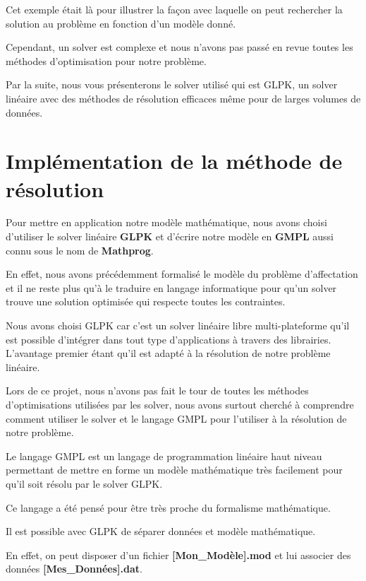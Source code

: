 \documentclass[final,poster]{polytech/polytech}
\begin{document}
Cet exemple était là pour illustrer la façon avec laquelle on peut rechercher la solution au problème en fonction d'un modèle donné.

Cependant, un solver est complexe et nous n'avons pas passé en revue toutes les méthodes d'optimisation pour notre problème.

Par la suite, nous vous présenterons le solver utilisé qui est GLPK, un solver linéaire avec des méthodes de résolution efficaces même pour de larges volumes de données.

\section{Implémentation de la méthode de résolution}

Pour mettre en application notre modèle mathématique, nous avons choisi d'utiliser le solver linéaire \textbf{GLPK} et d'écrire notre modèle en \textbf{GMPL} aussi connu sous le nom de \textbf{Mathprog}.

En effet, nous avons précédemment formalisé le modèle du problème d'affectation et il ne reste plus qu'à le traduire en langage informatique pour qu'un solver trouve une solution optimisée qui respecte toutes les contraintes.

Nous avons choisi GLPK car c'est un solver linéaire libre multi-plateforme qu'il est possible d'intégrer dans tout type d'applications à travers des librairies. L'avantage premier étant qu'il est adapté à la résolution de notre problème linéaire.

Lors de ce projet, nous n'avons pas fait le tour de toutes les méthodes d'optimisations utilisées par les solver, nous avons surtout cherché à comprendre comment utiliser le solver et le langage GMPL pour l'utiliser à la résolution de notre problème.
 
Le langage GMPL est un langage de programmation linéaire haut niveau permettant de mettre en forme un modèle mathématique très facilement pour qu'il soit résolu par le solver GLPK.

Ce langage a été pensé pour être très proche du formalisme mathématique.

Il est possible avec GLPK de séparer données et modèle mathématique. 

En effet, on peut disposer d'un fichier \textbf{[Mon\_Modèle].mod} et lui associer des données \textbf{[Mes\_Données].dat}.
\end{document}
